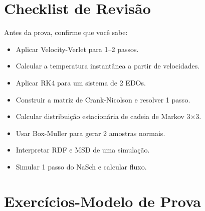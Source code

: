 \documentclass[12pt,a4paper]{article}
\begin{document}
\section*{Checklist de Revis\~ao}
Antes da prova, confirme que voc\^e sabe:
\begin{itemize}
  \item[$\square$] Aplicar Velocity-Verlet para 1--2 passos.
  \item[$\square$] Calcular a temperatura instant\^anea a partir de velocidades.
  \item[$\square$] Aplicar RK4 para um sistema de 2 EDOs.
  \item[$\square$] Construir a matriz de Crank-Nicolson e resolver 1 passo.
  \item[$\square$] Calcular distribui\c{c}\~ao estacion\'aria de cadeia de Markov 3$\times$3.
  \item[$\square$] Usar Box-Muller para gerar 2 amostras normais.
  \item[$\square$] Interpretar RDF e MSD de uma simula\c{c}\~ao.
  \item[$\square$] Simular 1 passo do NaSch e calcular fluxo.
\end{itemize}

\section*{Exerc\'icios-Modelo de Prova}
\end{document}
